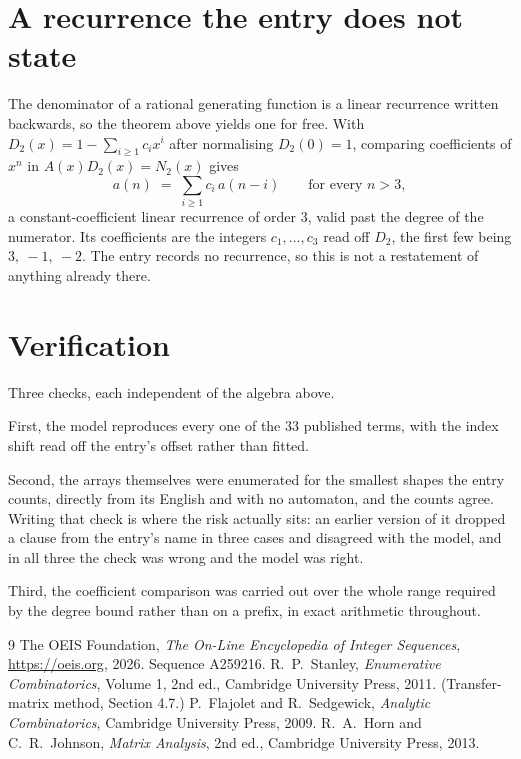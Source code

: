 \documentclass[11pt,a4paper]{article}
\theoremstyle{plain}
\theoremstyle{definition}
\begin{document}
\section{A recurrence the entry does not state}

The denominator of a rational generating function is a linear recurrence written backwards, so
the theorem above yields one for free. With $D_2(x)=1-\sum_{i\ge1}c_ix^i$ after normalising
$D_2(0)=1$, comparing coefficients of $x^n$ in $A(x)D_2(x)=N_2(x)$ gives
\[
a(n)\;=\;\sum_{i\ge1}c_i\,a(n-i)\qquad\text{for every }n>3,
\]
a constant-coefficient linear recurrence of order $3$, valid past the degree of the
numerator. Its coefficients are the integers $c_1,\dots,c_{3}$ read off $D_2$, the first few being $3,\ -1,\ -2$. The entry records no recurrence, so this is not a restatement of anything
already there.

\section{Verification}

Three checks, each independent of the algebra above.

First, the model reproduces every one of the $33$ published terms, with the index shift
read off the entry's offset rather than fitted.

Second, the arrays themselves were enumerated for the smallest shapes the entry counts,
directly from its English and with no automaton, and the counts agree. Writing that check is
where the risk actually sits: an earlier version of it dropped a clause from the entry's name
in three cases and disagreed with the model, and in all three the check was wrong and the model
was right.

Third, the coefficient comparison was carried out over the whole range required by the degree
bound rather than on a prefix, in exact arithmetic throughout.

\begin{thebibliography}{9}
 The OEIS Foundation, \emph{The On-Line Encyclopedia of Integer
Sequences}, \url{https://oeis.org}, 2026. Sequence A259216.
 R.~P.~Stanley, \emph{Enumerative Combinatorics}, Volume 1, 2nd ed.,
Cambridge University Press, 2011. (Transfer-matrix method, Section 4.7.)
 P.~Flajolet and R.~Sedgewick, \emph{Analytic Combinatorics}, Cambridge
University Press, 2009.
 R.~A.~Horn and C.~R.~Johnson, \emph{Matrix Analysis}, 2nd ed., Cambridge
University Press, 2013.
\end{thebibliography}
\end{document}
